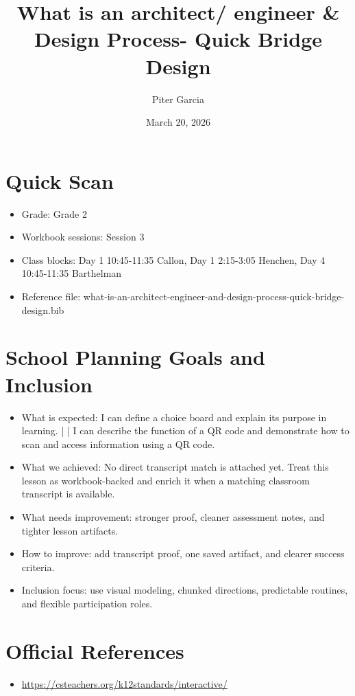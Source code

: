 \documentclass[11pt]{article}
\title{What is an architect/ engineer & Design Process- Quick Bridge Design}
\author{Piter Garcia}
\date{March 20, 2026}
\begin{document}
\maketitle
\section*{Quick Scan}
\begin{itemize}[leftmargin=*]
\item Grade: Grade 2
\item Workbook sessions: Session 3
\item Class blocks: Day 1 10:45-11:35 Callon, Day 1 2:15-3:05 Henchen, Day 4 10:45-11:35 Barthelman
\item Reference file: what-is-an-architect-engineer-and-design-process-quick-bridge-design.bib
\end{itemize}
\section*{School Planning Goals and Inclusion}
\begin{itemize}[leftmargin=*]
\item What is expected: I can define a choice board and explain its purpose in learning. | | I can describe the function of a QR code and demonstrate how to scan and access information using a QR code.
\item What we achieved: No direct transcript match is attached yet. Treat this lesson as workbook-backed and enrich it when a matching classroom transcript is available.
\item What needs improvement: stronger proof, cleaner assessment notes, and tighter lesson artifacts.
\item How to improve: add transcript proof, one saved artifact, and clearer success criteria.
\item Inclusion focus: use visual modeling, chunked directions, predictable routines, and flexible participation roles.
\end{itemize}
\section*{Official References}
\begin{itemize}[leftmargin=*]
\item \url{https://csteachers.org/k12standards/interactive/}

\end{itemize}
\end{document}
